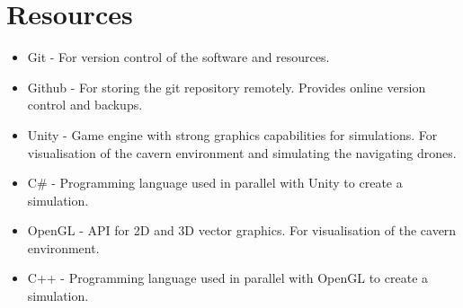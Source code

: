 \documentclass[12pt]{article}
\begin{document}
\pagebreak[4]

\section{Resources}

\begin{itemize}
    \item Git - For version control of the software and resources.
    \item Github - For storing the git repository remotely. Provides online version control and backups.
    \item Unity - Game engine with strong graphics capabilities for simulations. For visualisation of the cavern environment and simulating the navigating drones.
    \item C\# - Programming language used in parallel with Unity to create a simulation.
    \item OpenGL - API for 2D and 3D vector graphics. For visualisation of the cavern environment.
    \item C++ - Programming language used in parallel with OpenGL to create a simulation.
\end{itemize}

\printbibliography
\end{document}
